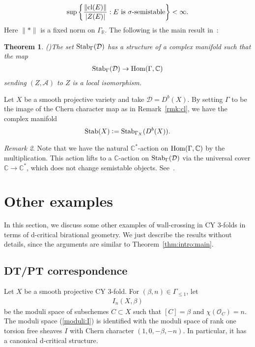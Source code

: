 \documentclass[11pt]{amsart}
\theoremstyle{plain}
\newtheorem{thm}{Theorem}[section]
\theoremstyle{definition}
\theoremstyle{remark}
\newtheorem{rmk}[thm]{Remark}
\newcommand{\aA}{\mathcal{A}}
\newcommand{\dD}{\mathcal{D}}
\newcommand{\oO}{\mathcal{O}}
\newcommand{\Hom}{\mathop{\rm Hom}\nolimits}
\newcommand{\Stab}{\mathop{\rm Stab}\nolimits}
\newcommand{\cl}{\mathop{\rm cl}\nolimits}
\begin{document}
\begin{align*}
\mathrm{sup}\left\{ \frac{\lVert \cl(E) \rVert}{\lvert Z(E) \rvert}
: E \mbox{ is } \sigma\mbox{-semistable} \right\}<\infty. 
\end{align*}
Here $\lVert \ast \rVert$ is a fixed norm on 
$\Gamma_{\mathbb{R}}$.
The following is the main result in~\cite{Brs1}:
\begin{thm}\emph{(\cite[Theorem~1.2]{Brs1})}\label{thm:Stab}
The set $\Stab_{\Gamma}(\dD)$ has a structure of a complex manifold such that 
the map
\begin{align*}
\Stab_{\Gamma}(\dD) \to \Hom(\Gamma, \mathbb{C})
\end{align*}
sending $(Z, \aA)$ to $Z$ is a local isomorphism. 
\end{thm}
Let $X$ be a smooth projective variety 
and take 
$\dD=D^b(X)$. 
By setting $\Gamma$ to be the 
image of the Chern character map 
as in Remark~\ref{rmk:cl}, 
we have the complex manifold
\begin{align*}
\Stab(X) \cneq \Stab_{\Gamma_X}(D^b(X)).
\end{align*}

\begin{rmk}\label{rmk:Caction}
Note that we have the natural $\mathbb{C}^{\ast}$-action 
on $\Hom(\Gamma, \mathbb{C})$
by the multiplication. 
This action lifts to a $\mathbb{C}$-action on 
$\Stab_{\Gamma}(\dD)$ via the universal 
cover $\mathbb{C} \to \mathbb{C}^{\ast}$, which 
does not change semistable objects. 
See~\cite[Section~3.3]{Brs6}. 
\end{rmk}

\section{Other examples}\label{sec:other}
In this section, we discuss some other examples of 
wall-crossing in CY 3-folds in terms of d-critical 
birational geometry. We just describe the results without 
details, since the arguments are similar to Theorem~\ref{thm:intro:main}.
\subsection{DT/PT correspondence}\label{subsec:DT/PT0}
Let $X$ be a smooth projective CY 3-fold. 
For $(\beta, n) \in \Gamma_{\le 1}$, let 
\begin{align}\label{moduli:I}
I_n(X, \beta)
\end{align}
be the moduli space of 
subschemes $C \subset X$
such that $[C]=\beta$ and $\chi(\oO_C)=n$. 
The moduli space (\ref{moduli:I}) is identified with 
the moduli space of rank one torsion free sheaves 
$I$ with Chern character $(1, 0, -\beta, -n)$. 
In particular, it has a canonical d-critical structure. 
\end{document}
